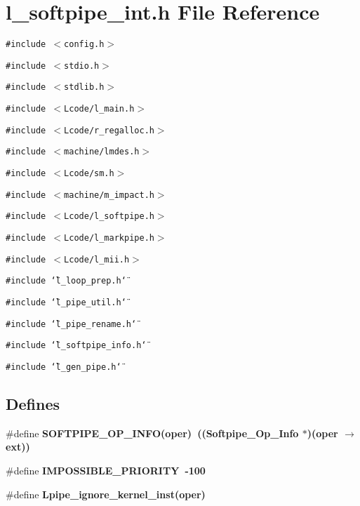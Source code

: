 \section{l\_\-softpipe\_\-int.h File Reference}
\label{l__softpipe__int_8h}
{\tt \#include $<$config.h$>$}\par
{\tt \#include $<$stdio.h$>$}\par
{\tt \#include $<$stdlib.h$>$}\par
{\tt \#include $<$Lcode/l\_\-main.h$>$}\par
{\tt \#include $<$Lcode/r\_\-regalloc.h$>$}\par
{\tt \#include $<$machine/lmdes.h$>$}\par
{\tt \#include $<$Lcode/sm.h$>$}\par
{\tt \#include $<$machine/m\_\-impact.h$>$}\par
{\tt \#include $<$Lcode/l\_\-softpipe.h$>$}\par
{\tt \#include $<$Lcode/l\_\-markpipe.h$>$}\par
{\tt \#include $<$Lcode/l\_\-mii.h$>$}\par
{\tt \#include \char`\"{}l\_\-loop\_\-prep.h\char`\"{}}\par
{\tt \#include \char`\"{}l\_\-pipe\_\-util.h\char`\"{}}\par
{\tt \#include \char`\"{}l\_\-pipe\_\-rename.h\char`\"{}}\par
{\tt \#include \char`\"{}l\_\-softpipe\_\-info.h\char`\"{}}\par
{\tt \#include \char`\"{}l\_\-gen\_\-pipe.h\char`\"{}}\par
\subsection*{Defines}
\begin{CompactItemize}
\item 
\#define \bf{SOFTPIPE\_\-OP\_\-INFO}(oper)~((\bf{Softpipe\_\-Op\_\-Info} $\ast$)(oper $\rightarrow$ ext))
\item 
\#define \bf{IMPOSSIBLE\_\-PRIORITY}~-100
\item 
\#define \bf{Lpipe\_\-ignore\_\-kernel\_\-inst}(oper)
\end{CompactItemize}
